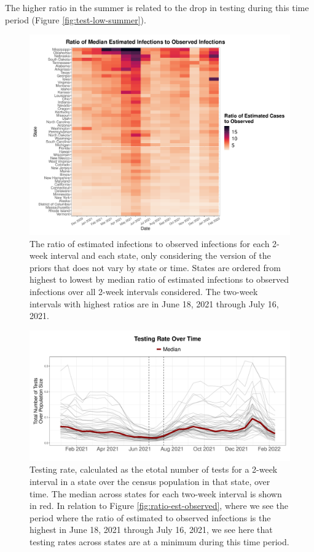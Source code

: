 \documentclass[12pt,twoside]{smiththesis}
\begin{document}
The higher ratio in the summer is related to the drop in testing during this time period (Figure \ref{fig:test-low-summer}).
\begin{figure}
\includegraphics[width=1\linewidth]{figure/heatmap_ratio_est_observed} \caption{\label{fig:ratio-est-observed} The ratio of estimated infections to observed infections for each 2-week interval and each state, only considering the version of the priors that does not vary by state or time. States are ordered from highest to lowest by median ratio of estimated infections to observed infections over all 2-week intervals considered. The two-week intervals with highest ratios are in June 18, 2021 through July 16, 2021.}\label{fig:unnamed-chunk-12}
\end{figure}
\begin{figure}
\includegraphics[width=0.8\linewidth]{figure/testrate-low-summer} \caption{\label{fig:test-low-summer}Testing rate, calculated as the etotal number of tests for a 2-week interval in a state over the census population in that state, over time. The median across states for each two-week interval is shown in red. In relation to Figure \ref{fig:ratio-est-observed}, where we see the period where the ratio of estimated to observed infections is the highest in June 18, 2021 through July 16, 2021, we see here that testing rates across states are at a minimum during this time period.}\label{fig:unnamed-chunk-13}
\end{figure}
\end{document}
